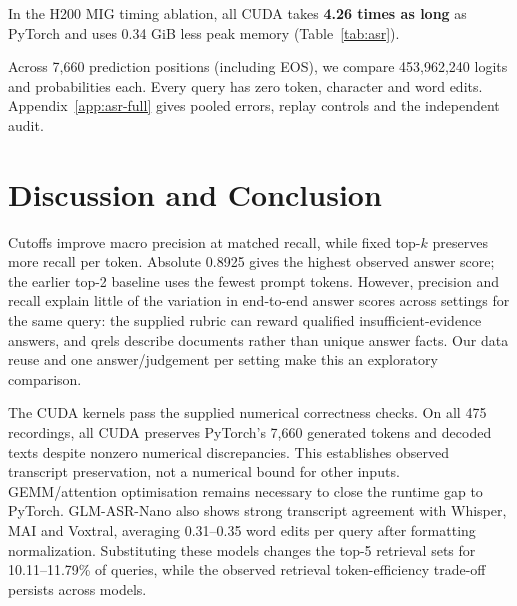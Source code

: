 \documentclass{article}
\begin{document}
In the H200 MIG timing ablation, all CUDA takes \textbf{4.26 times as long} as PyTorch and uses 0.34 GiB less peak memory (Table~\ref{tab:asr}).

Across 7,660 prediction positions (including EOS), we compare 453,962,240 logits and probabilities each. Every query has zero token, character and word edits. Appendix~\ref{app:asr-full} gives pooled errors, replay controls and the independent audit.

\clearpage


\section{Discussion and Conclusion}\label{sec:conclusion}
Cutoffs improve macro precision at matched recall, while fixed top-$k$ preserves more recall per token. Absolute 0.8925 gives the highest observed answer score; the earlier top-2 baseline uses the fewest prompt tokens. However, precision and recall explain little of the variation in end-to-end answer scores across settings for the same query: the supplied rubric can reward qualified insufficient-evidence answers, and qrels describe documents rather than unique answer facts. Our data reuse and one answer/judgement per setting make this an exploratory comparison.

The CUDA kernels pass the supplied numerical correctness checks. On all 475 recordings, all CUDA preserves PyTorch's 7,660 generated tokens and decoded texts despite nonzero numerical discrepancies. This establishes observed transcript preservation, not a numerical bound for other inputs. GEMM/attention optimisation remains necessary to close the runtime gap to PyTorch. GLM-ASR-Nano also shows strong transcript agreement with Whisper, MAI and Voxtral, averaging 0.31--0.35 word edits per query after formatting normalization. Substituting these models changes the top-5 retrieval sets for 10.11--11.79\% of queries, while the observed retrieval token-efficiency trade-off persists across models.

\clearpage



\clearpage
\appendix
\end{document}
